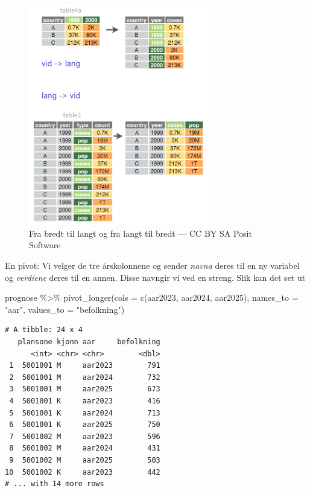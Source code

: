 \documentclass[
  letterpaper,
  DIV=11,
  numbers=noendperiod]{scrreprt}
\newenvironment{Shaded}{\begin{snugshade}}{\end{snugshade}}
\newcommand{\AttributeTok}[1]{\textcolor[rgb]{0.40,0.45,0.13}{#1}}
\newcommand{\FunctionTok}[1]{\textcolor[rgb]{0.28,0.35,0.67}{#1}}
\newcommand{\NormalTok}[1]{\textcolor[rgb]{0.00,0.23,0.31}{#1}}
\newcommand{\SpecialCharTok}[1]{\textcolor[rgb]{0.37,0.37,0.37}{#1}}
\newcommand{\StringTok}[1]{\textcolor[rgb]{0.13,0.47,0.30}{#1}}
\begin{document}
\begin{figure}

{\centering \includegraphics[width=0.7\textwidth,height=\textheight]{./img/posit_pivot_tableonly.png}

}

\caption{Fra bredt til langt og fra langt til bredt --- CC BY SA Posit
Software}

\end{figure}

En pivot: Vi velger de tre årskolonnene og sender \emph{navna} deres til
en ny variabel og \emph{verdiene} deres til en annen. Disse navngir vi
ved en streng. Slik kan det set ut

\begin{Shaded}
\begin{Highlighting}[]
\NormalTok{prognose }\SpecialCharTok{\%\textgreater{}\%} 
  \FunctionTok{pivot\_longer}\NormalTok{(}\AttributeTok{cols =} \FunctionTok{c}\NormalTok{(aar2023, aar2024, aar2025), }
               \AttributeTok{names\_to =} \StringTok{"aar"}\NormalTok{, }
               \AttributeTok{values\_to =} \StringTok{"befolkning"}\NormalTok{)}
\end{Highlighting}
\end{Shaded}

\begin{verbatim}
# A tibble: 24 x 4
   plansone kjonn aar     befolkning
      <int> <chr> <chr>        <dbl>
 1  5001001 M     aar2023        791
 2  5001001 M     aar2024        732
 3  5001001 M     aar2025        673
 4  5001001 K     aar2023        416
 5  5001001 K     aar2024        713
 6  5001001 K     aar2025        750
 7  5001002 M     aar2023        596
 8  5001002 M     aar2024        431
 9  5001002 M     aar2025        503
10  5001002 K     aar2023        442
# ... with 14 more rows
\end{verbatim}
\end{document}
